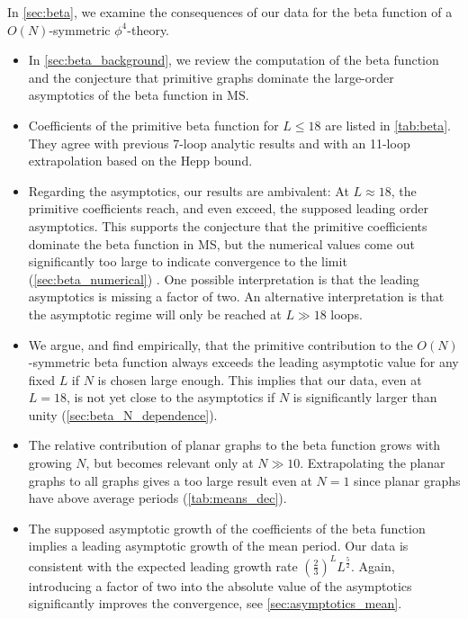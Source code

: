 \documentclass[12pt,a4paper]{article}
\renewcommand{\|}{\rule[-0.4ex]{0.2ex}{1.2em}}
\begin{document}
\noindent
In \cref{sec:beta}, we examine the consequences of our data for  the beta function of a $O(N)$-symmetric $\phi^4$-theory.
\begin{itemize}
	\item In \cref{sec:beta_background}, we review the computation  of the  beta function and the conjecture that primitive graphs dominate the large-order asymptotics of the beta function in MS. 
	\item Coefficients of the primitive beta function for $L \leq 18$ are listed in \cref{tab:beta}. They agree with previous 7-loop analytic results and with an 11-loop extrapolation based on the Hepp bound. 
	\item Regarding the asymptotics, our results are ambivalent: At $L \approx 18$, the primitive coefficients reach, and even exceed, the supposed leading order asymptotics. This supports the conjecture that the primitive coefficients dominate the beta function in MS, but the numerical values come out significantly too large to indicate convergence to the limit (\cref{sec:beta_numerical}) . One possible interpretation is that the leading asymptotics is missing a factor of two. An alternative interpretation is that the asymptotic regime will only be reached at $L \gg 18$ loops. 
	\item We argue, and find empirically, that the primitive contribution to the $O(N)$-symmetric beta function always exceeds the leading asymptotic value for any fixed $L$ if $N$ is chosen large enough. This implies that our data, even at $L=18$, is not yet close to the asymptotics if $N$ is significantly larger than unity (\cref{sec:beta_N_dependence}). 
	\item The relative contribution of planar graphs to the beta function grows with growing $N$, but becomes relevant only at $N \gg 10$. Extrapolating the planar graphs to all graphs gives a too large result even at $N=1$ since planar graphs have above average periods (\cref{tab:means_dec}).
	\item The supposed asymptotic growth of the coefficients of the beta function implies a leading asymptotic growth of the mean period. Our data is consistent with the expected leading growth rate $\left( \frac{2}{3} \right) ^L L^{\frac 5 2}$. Again, introducing a factor of two into the absolute value of the asymptotics significantly improves the convergence, see \cref{sec:asymptotics_mean}.
\end{itemize}
\end{document}
